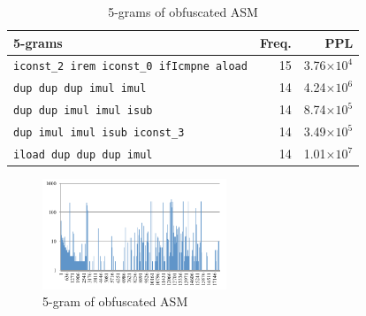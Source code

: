 \documentclass[conference]{IEEEtran}
\begin{document}
\begin{table}[t]
  \centering
  \footnotesize{
    \caption{5-grams of obfuscated ASM}\label{table:asm}
  \begin{tabular}{l|r|r}
    \textbf{5-grams} & \textbf{Freq.} & \textbf{PPL}\\ \hline
    \texttt{iconst\_2 irem iconst\_0 ifIcmpne aload}  & 15 & 3.76$\times10^4$ \\
    \texttt{dup dup dup imul imul}                    & 14 & 4.24$\times10^6$ \\
    \texttt{dup dup imul imul isub}                   & 14 & 8.74$\times10^5$ \\
    \texttt{dup imul imul isub iconst\_3}             & 14 & 3.49$\times10^5$ \\
    \texttt{iload dup dup dup imul}                   & 14 & 1.01$\times10^7$ \\
    \end{tabular}}
\end{table}


\begin{figure}[b]
  \centering
  \includegraphics[width=0.49\textwidth]{images/SOP_ASM}
  \caption{5-gram of obfuscated ASM}\label{fig:SOP}
\end{figure}


\end{document}
